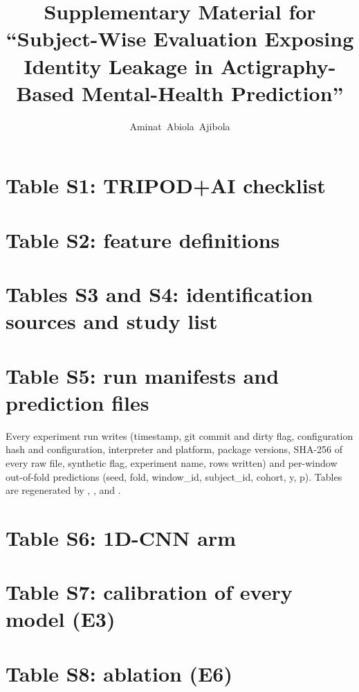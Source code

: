 \documentclass[journal,onecolumn]{IEEEtran}
\begin{document}
\title{Supplementary Material for ``Subject-Wise Evaluation Exposing Identity Leakage in Actigraphy-Based Mental-Health Prediction''}
\author{Aminat~Abiola~Ajibola}
\maketitle
\section{Table S1: TRIPOD+AI checklist}
\begingroup\footnotesize\endgroup
\section{Table S2: feature definitions}
\begingroup\footnotesize\endgroup
\section{Tables S3 and S4: identification sources and study list}
\begingroup\footnotesize\endgroup

\section{Table S5: run manifests and prediction files}
Every experiment run writes  (timestamp, git commit and dirty flag, configuration hash and configuration, interpreter and platform, package versions, SHA-256 of every raw file, synthetic flag, experiment name, rows written) and per-window out-of-fold predictions  (seed, fold, window\_id, subject\_id, cohort, y, p). Tables are regenerated by , ,  and .
\section{Table S6: 1D-CNN arm}

\section{Table S7: calibration of every model (E3)}

\section{Table S8: ablation (E6)}

\end{document}
